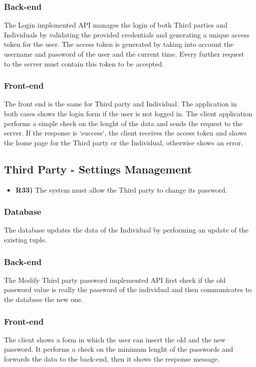 \subsubsection*{Back-end}
The Login implemented API manages the login of both Third parties and Individuals by validating the provided credentials and generating a unique access token for the user. 
The access token is generated by taking into account the username and password of the user and the current time.
Every further request to the server must contain this token to be accepted.

\subsubsection*{Front-end}
The front end is the same for Third party and Individual. The application in both cases shows the login form if the user is not logged in.
The client application performs a simple check on the lenght of the data and sends the request to the server. If the response is `success`, the client receives the access token and shows the home page for the Third party or the Individual, otherwise shows an error.

\subsection{Third Party - Settings Management}
\begin{itemize}
	\item {\color{Green}\textbf{R33)}} The system must allow the Third party to change its password.
\end{itemize}
\subsubsection*{Database}
The database updates the data of the Individual by performing an update of the existing tuple.

\subsubsection*{Back-end}
The Modify Third party password implemented API first check if the old password value is really the password of the individual and then communicates to the database the new one. 

\subsubsection*{Front-end}
The client shows a form in which the user can insert the old and the new password. It performs a check on the minimum lenght of the passwords and forwards the data to the back-end, then it shows the response message.

